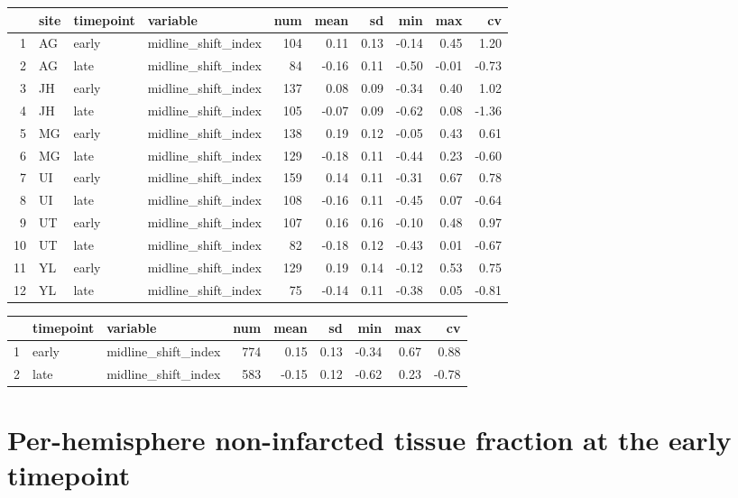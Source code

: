 \documentclass[
]{article}
\begin{document}
\begin{table}[ht]
\centering
\begin{tabular}{rlllrrrrrr}
  \hline
 & site & timepoint & variable & num & mean & sd & min & max & cv \\ 
  \hline
1 & AG & early & midline\_shift\_index & 104 & 0.11 & 0.13 & -0.14 & 0.45 & 1.20 \\ 
  2 & AG & late & midline\_shift\_index &  84 & -0.16 & 0.11 & -0.50 & -0.01 & -0.73 \\ 
  3 & JH & early & midline\_shift\_index & 137 & 0.08 & 0.09 & -0.34 & 0.40 & 1.02 \\ 
  4 & JH & late & midline\_shift\_index & 105 & -0.07 & 0.09 & -0.62 & 0.08 & -1.36 \\ 
  5 & MG & early & midline\_shift\_index & 138 & 0.19 & 0.12 & -0.05 & 0.43 & 0.61 \\ 
  6 & MG & late & midline\_shift\_index & 129 & -0.18 & 0.11 & -0.44 & 0.23 & -0.60 \\ 
  7 & UI & early & midline\_shift\_index & 159 & 0.14 & 0.11 & -0.31 & 0.67 & 0.78 \\ 
  8 & UI & late & midline\_shift\_index & 108 & -0.16 & 0.11 & -0.45 & 0.07 & -0.64 \\ 
  9 & UT & early & midline\_shift\_index & 107 & 0.16 & 0.16 & -0.10 & 0.48 & 0.97 \\ 
  10 & UT & late & midline\_shift\_index &  82 & -0.18 & 0.12 & -0.43 & 0.01 & -0.67 \\ 
  11 & YL & early & midline\_shift\_index & 129 & 0.19 & 0.14 & -0.12 & 0.53 & 0.75 \\ 
  12 & YL & late & midline\_shift\_index &  75 & -0.14 & 0.11 & -0.38 & 0.05 & -0.81 \\ 
   \hline
\end{tabular}
\end{table}
\begin{table}[ht]
\centering
\begin{tabular}{rllrrrrrr}
  \hline
 & timepoint & variable & num & mean & sd & min & max & cv \\ 
  \hline
1 & early & midline\_shift\_index & 774 & 0.15 & 0.13 & -0.34 & 0.67 & 0.88 \\ 
  2 & late & midline\_shift\_index & 583 & -0.15 & 0.12 & -0.62 & 0.23 & -0.78 \\ 
   \hline
\end{tabular}
\end{table}

\hypertarget{per-hemisphere-non-infarcted-tissue-fraction-at-the-early-timepoint}{%
\section{Per-hemisphere non-infarcted tissue fraction at the early
timepoint}\label{per-hemisphere-non-infarcted-tissue-fraction-at-the-early-timepoint}}
\end{document}
